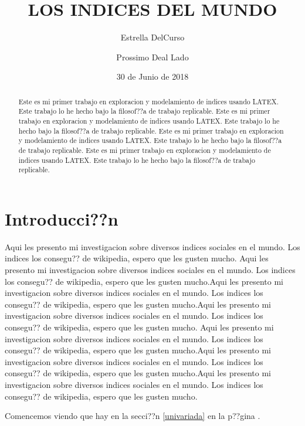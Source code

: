 \documentclass{article}
\title{LOS INDICES DEL MUNDO}
\author[1]{\normalsize Estrella DelCurso}
\author[2]{\normalsize Prossimo Deal Lado}
\affil[1,2]{\small  Escuela de Ingenier??a,Universidad de los Andes\\
\texttt{{delcurso,deallado}@uniandes.edu.col}}
\affil[1]{\small Instituto de altas investigaciones financieras\\
Banco del Parque\\
\texttt{delcurso@bp.com.col}}
\date{30 de Junio de 2018}
\begin{document}


\maketitle


\begin{abstract}
Este es mi primer trabajo en exploracion y modelamiento de indices usando LATEX. Este trabajo lo he hecho bajo la filosof??a de trabajo replicable. Este es mi primer trabajo en exploracion y modelamiento de indices usando LATEX. Este trabajo lo he hecho bajo la filosof??a de trabajo replicable. Este es mi primer trabajo en exploracion y modelamiento de indices usando LATEX. Este trabajo lo he hecho bajo la filosof??a de trabajo replicable. Este es mi primer trabajo en exploracion y modelamiento de indices usando LATEX. Este trabajo lo he hecho bajo la filosof??a de trabajo replicable.
\end{abstract}

\section*{Introducci??n}

Aqui les presento mi investigacion sobre diversos indices sociales en el mundo. Los indices los consegu?? de wikipedia, espero que les gusten mucho. Aqui les presento mi investigacion sobre diversos indices sociales en el mundo. Los indices los consegu?? de wikipedia, espero que les gusten mucho.Aqui les presento mi investigacion sobre diversos indices sociales en el mundo. Los indices los consegu?? de wikipedia, espero que les gusten mucho.Aqui les presento mi investigacion sobre diversos indices sociales en el mundo. Los indices los consegu?? de wikipedia, espero que les gusten mucho.
Aqui les presento mi investigacion sobre diversos indices sociales en el mundo. Los indices los consegu?? de wikipedia, espero que les gusten mucho.Aqui les presento mi investigacion sobre diversos indices sociales en el mundo. Los indices los consegu?? de wikipedia, espero que les gusten mucho.Aqui les presento mi investigacion sobre diversos indices sociales en el mundo. Los indices los consegu?? de wikipedia, espero que les gusten mucho.

Comencemos viendo que hay en la secci??n \ref{univariada} en la p??gina \pageref{univariada}.

\clearpage








\renewcommand{\refname}{Bibliography}

\end{document}
